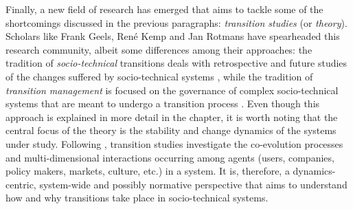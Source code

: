 Finally, a new field of research has emerged that aims to tackle some of the shortcomings discussed in the previous paragraphs: \emph{transition studies} (or \emph{theory}). Scholars like Frank Geels, René Kemp and Jan Rotmans have spearheaded this research community, albeit some differences among their approaches: the tradition of \emph{socio-technical} transitions deals with retrospective and future studies of the changes suffered by socio-technical systems \parencite{geels2001_Technologicaltransitionsas,geels2005_DynamicsTransitionsSocio}, while the tradition of \emph{transition management} is focused on the governance of complex socio-technical systems that are meant to undergo a transition process \parencite{rotmans2001_Moreevolutionthan}. Even though this approach is explained in more detail in the  chapter, it is worth noting that the central focus of the theory is the stability and change dynamics of the systems under study. Following \textcite{geels2001_Technologicaltransitionsas,rotmans2001_Moreevolutionthan}, transition studies investigate the co-evolution processes and multi-dimensional interactions occurring among agents (users, companies, policy makers, markets, culture, etc.) in a system. It is, therefore, a dynamics-centric, system-wide and possibly normative perspective that aims to understand how and why transitions take place in socio-technical systems.
